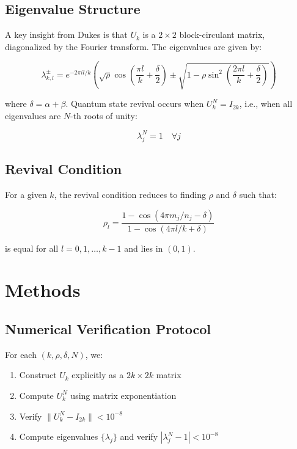 \documentclass[12pt]{article}
\begin{document}
\subsection{Eigenvalue Structure}

A key insight from Dukes is that \(U_k\) is a \(2 \times 2\) block-circulant matrix, diagonalized by the Fourier transform. The eigenvalues are given by:

\[
\lambda_{k,l}^{\pm} = e^{-2\pi i l/k} \left( \sqrt{\rho} \cos\left(\frac{\pi l}{k} + \frac{\delta}{2}\right) \pm \sqrt{1 - \rho \sin^2\left(\frac{2\pi l}{k} + \frac{\delta}{2}\right)} \right)
\]

where \(\delta = \alpha + \beta\). Quantum state revival occurs when \(U_k^N = I_{2k}\), i.e., when all eigenvalues are \(N\)-th roots of unity:

\[
\lambda_j^N = 1 \quad \forall j
\]

\subsection{Revival Condition}

For a given \(k\), the revival condition reduces to finding \(\rho\) and \(\delta\) such that:

\[
\rho_l = \frac{1 - \cos(4\pi m_j/n_j - \delta)}{1 - \cos(4\pi l/k + \delta)}
\]

is equal for all \(l = 0, 1, \ldots, k-1\) and lies in \((0,1)\).

\section{Methods}

\subsection{Numerical Verification Protocol}

For each \((k, \rho, \delta, N)\), we:

\begin{enumerate}
    \item Construct \(U_k\) explicitly as a \(2k \times 2k\) matrix
    \item Compute \(U_k^N\) using matrix exponentiation
    \item Verify \(\|U_k^N - I_{2k}\| < 10^{-8}\)
    \item Compute eigenvalues \(\{\lambda_j\}\) and verify \(|\lambda_j^N - 1| < 10^{-8}\)
\end{enumerate}
\end{document}
